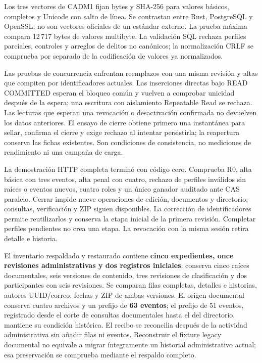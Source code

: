 Los tres vectores de CADM1 fijan bytes y SHA-256 para valores básicos, completos y Unicode con salto de línea. Se contrastan entre Rust, PostgreSQL y OpenSSL; no son vectores oficiales de un estándar externo. La prueba máxima compara 12\,717 bytes de valores multibyte. La validación SQL rechaza perfiles parciales, controles y arreglos de delitos no canónicos; la normalización CRLF se comprueba por separado de la codificación de valores ya normalizados.

Las pruebas de concurrencia enfrentan reemplazos con una misma revisión y altas que compiten por identificadores actuales. Las inserciones directas bajo READ COMMITTED esperan el bloqueo común y vuelven a comprobar unicidad después de la espera; una escritura con aislamiento Repeatable Read se rechaza. Las lecturas que esperan una revocación o desactivación confirmada no devuelven los datos anteriores. El ensayo de cierre obtiene primero una instantánea para sellar, confirma el cierre y exige rechazo al intentar persistirla; la reapertura conserva las fichas existentes. Son condiciones de consistencia, no mediciones de rendimiento ni una campaña de carga.

La demostración HTTP completa terminó con código cero. Comprueba R0, alta básica con tres eventos, alta penal con cuatro, rechazo de perfiles inválidos sin raíces o eventos nuevos, cuatro roles y un único ganador auditado ante CAS paralelo. Cerrar impide nueve operaciones de edición, documentos y directorio; consultas, verificación y ZIP siguen disponibles. La corrección de identificadores permite reutilizarlos y conserva la etapa inicial de la primera revisión. Completar perfiles pendientes no crea una etapa. La revocación con la misma sesión retira detalle e historia.

El inventario respaldado y restaurado contiene \textbf{cinco expedientes, once revisiones administrativas y dos registros iniciales}; conserva cinco raíces documentales, seis versiones de contenido, tres revisiones de clasificación y dos participantes con seis revisiones. Se comparan filas completas, detalles e historias, autores UUID/correo, fechas y ZIP de ambas versiones. El origen documental conserva cuatro archivos y un prefijo de \textbf{63 eventos}; el prefijo de 51 eventos, registrado desde el corte de consultas documentales hasta el del directorio, mantiene su condición histórica. El recibo se reconcilia después de la actividad administrativa sin añadir filas ni eventos. Reconstruir el fixture legacy documental no equivale a migrar íntegramente un historial administrativo actual; esa preservación se comprueba mediante el respaldo completo.

